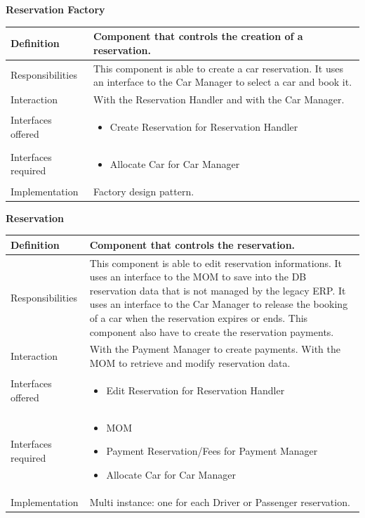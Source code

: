 \documentclass{article}
\begin{document}
			\pagebreak
			\begin{center}
				\centerline{\textbf{Reservation Factory}}	
				\begin{tabular}{| l | p{9cm} |}\hline
					Definition & Component that controls the creation of a reservation.\\\hline
					Responsibilities & This component is able to create a car reservation. It uses an interface to the Car Manager to select a car and book it.\\\hline
					Interaction & With the Reservation Handler and with the Car Manager.\\\hline
					Interfaces offered & \begin{itemize}
						\item Create Reservation for Reservation Handler
					\end{itemize}\\\hline
					Interfaces required & \begin{itemize}
						\item Allocate Car for Car Manager
					\end{itemize}\\\hline
					Implementation & Factory design pattern.\\\hline
				\end{tabular}
			\end{center}
			\begin{center}
				\centerline{\textbf{Reservation}}	
				\begin{tabular}{| l | p{9cm} |}\hline
					Definition & Component that controls the reservation.\\\hline
					Responsibilities & This component is able to edit reservation informations. It uses an interface to the MOM to save into the DB reservation data that is not managed by the legacy ERP. It uses an interface to the Car Manager to release the booking of a car when the reservation expires or ends. This component also have to create the reservation payments.\\\hline
					Interaction & With the Payment Manager to create payments. With the MOM to retrieve and modify reservation data. \\\hline
					Interfaces offered & \begin{itemize}
						\item Edit Reservation for Reservation Handler
					\end{itemize}\\\hline
					Interfaces required & \begin{itemize}
						\item MOM
						\item Payment Reservation/Fees for Payment Manager
						\item Allocate Car for Car Manager
					\end{itemize}\\\hline
					Implementation & Multi instance: one for each Driver or Passenger reservation.\\\hline
				\end{tabular}
			\end{center}
			\pagebreak
			
\end{document}
